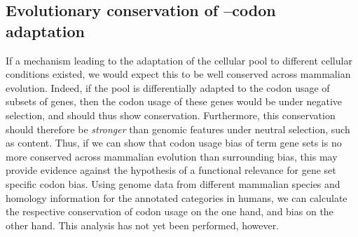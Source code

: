 \subsection{Evolutionary conservation of --codon adaptation}

If a mechanism leading to the adaptation of the cellular \trna pool to different
cellular conditions existed, we would expect this to be well conserved across
mammalian evolution. Indeed, if the \trna pool is differentially adapted to the
codon usage of subsets of genes, then the codon usage of these genes would be
under negative selection, and should thus show conservation. Furthermore, this
conservation should therefore be \emph{stronger} than genomic features under
neutral selection, such as \gc content. Thus, if we can show that codon usage
bias of \go term gene sets is no more conserved across mammalian evolution than
surrounding \gc bias, this may provide evidence against the hypothesis of a
functional relevance for gene set specific codon bias. Using genome data from
different mammalian species and homology information for the annotated \go
categories in humans, we can calculate the respective conservation of codon
usage on the one hand, and \gc bias on the other hand. This analysis has not yet
been performed, however.
